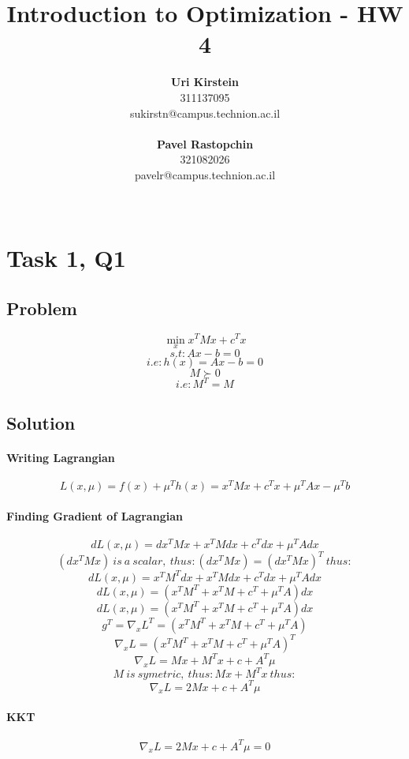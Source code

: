 \documentclass[12pt]{article}
\begin{document}
\title{\Huge Introduction to Optimization - HW 4}

\author{
  \textbf{Uri Kirstein}\\
  311137095 \\ sukirstn@campus.technion.ac.il
  \\ \\
  \textbf{Pavel Rastopchin}\\
  321082026 \\ pavelr@campus.technion.ac.il
  \\ \\ 
}

\maketitle


\newpage
\section{Task 1, Q1}
\subsection{Problem}
\[\min_x x^T M x + c^T x\]
\[s.t: Ax - b = 0\]
\[i.e: h(x)= Ax - b = 0\]
\[M \succ 0\] 
\[i.e: M^T=M\]

\subsection{Solution}
\paragraph{Writing Lagrangian}
\[L(x, \mu)=f(x) + \mu ^T h(x) = x^T M x + c^T x + \mu ^T A x - \mu ^ T b\]

\paragraph{Finding Gradient of Lagrangian}
\[dL(x, \mu)= dx^T Mx + x^T Mdx + c^T dx + \mu ^T Adx \]
\[(dx^T Mx)\ is \ a \ scalar, \ thus: (dx^T Mx) = (dx^T Mx)^T \ thus:\]
\[dL(x, \mu) = x^T M^T dx + x^T M dx + c^T dx + \mu ^T Adx \]
\[dL(x, \mu)= (x^T M^T + x^T M + c^T + \mu ^T A)dx \]
\[dL(x, \mu)= (x^T M^T + x^T M + c^T + \mu ^T A)dx \]
\[g^T = \nabla_x L^T = (x^T M^T + x^T M + c^T + \mu ^T A)\]
\[\nabla_x L = (x^T M^T + x^T M + c^T + \mu ^T A)^T\]
\[\nabla_x L = Mx + M^T x + c + A^T \mu\]
\[M \ is \ symetric, \ thus: Mx + M^T x\ thus:\]
\[\nabla_x L = 2Mx + c + A^T \mu\]
\paragraph{KKT}
\[\nabla_x L = 2Mx + c + A^T \mu = 0 \]
\end{document}
